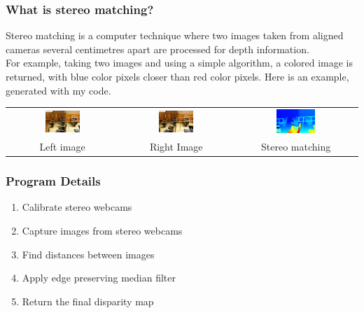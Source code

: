 \documentclass[19pt]{beamer}
\begin{document}
\begin{frame}
\frametitle{What is stereo matching?}

Stereo matching is a computer technique where two images taken from aligned cameras several centimetres apart are processed for depth information. \\[10pt]
%
For example, taking two images and using a simple algorithm, a colored image is returned, with blue color pixels closer than red color pixels. Here is an example, generated with my code.\\[20pt]

\centering
\setlength{}
\begin{tabular}{ccc}
\includegraphics[width=0.33\textwidth]{images/im0-600.jpg} &
\includegraphics[width=0.33\textwidth]{images/im1-600.jpg} &
\includegraphics[width=0.33\textwidth]{images/disp-600.jpg} \\[2pt]
Left image & Right Image & Stereo matching \\
\end{tabular}

\end{frame}


\begin{frame}
\frametitle{Program Details}
\begin{enumerate}
    \item Calibrate stereo webcams\\[10pt]
    \item Capture images from stereo webcams\\[10pt]
    \item Find distances between images\\[10pt]
    \item Apply edge preserving median filter\\[10pt]
    \item Return the final disparity map 
\end{enumerate}
\end{frame}
\end{document}
